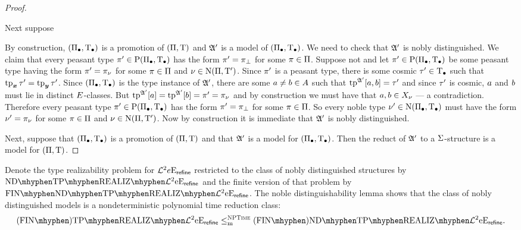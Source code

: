 \begin{proof}
\begin{itemize}
  Next suppose 
\end{itemize}

 By
construction, $(\Pi_{\bullet},\mathrm{T}_{\bullet})$ is a promotion of $(\Pi,\mathrm{T})$ and $\mathfrak{A'}$ is a
model of $(\Pi_{\bullet},\mathrm{T}_{\bullet})$.
We need to check that $\mathfrak{A'}$ is nobly distinguished.
We claim that every peasant type ${\pi'} \in \mathrm{P}(\Pi_{\bullet},\mathrm{T}_{\bullet})$ has the form
${\pi'} = {\pi}_{\bot}$ for some $\pi\in\Pi$.
Suppose not and let ${\pi'}\in \mathrm{P}(\Pi_{\bullet},\mathrm{T}_{\bullet})$ be some peasant type having
the form ${\pi'} = {\pi}_{\nu}$ for some $\pi\in\Pi$ and
$\nu\in\mathrm{\mathrm{N}}(\Pi,{\mathrm{T}'})$. 
Since ${\pi'}$ is a peasant type, there is some cosmic ${\tau'} \in \mathrm{T}_{\bullet}$ such
that $\operatorname{tp}_{\bm{x}}{\tau'} = \operatorname{tp}_{\bm{y}}{\tau'}$. Since $(\Pi_{\bullet},\mathrm{T}_{\bullet})$ is the type instance of
$\mathfrak{A'}$, there are some $a \neq b \in A$ such that $\operatorname{tp}^{\mathfrak{A'}}[a,b] = {\tau'}$ and
since ${\tau'}$ is cosmic, $a$ and $b$ must lie in distinct $E$-classes.
But $\operatorname{tp}^{\mathfrak{A'}}[a] = \operatorname{tp}^{\mathfrak{A'}}[b] = {\pi'} = {\pi}_{\nu}$ and by
construction we must have that $a, b \in X_\nu$ --- a contradiction.
Therefore every peasant type ${\pi'} \in \mathrm{P}(\Pi_{\bullet},\mathrm{T}_{\bullet})$ has the form
${\pi'} = {\pi}_{\bot}$ for some $\pi \in \Pi$. So every noble type ${\nu'}
\in \mathrm{\mathrm{N}}(\Pi_{\bullet},\mathrm{T}_{\bullet})$ must have the form ${\nu'} = {\pi}_{\nu}$ for some
$\pi \in \Pi$ and $\nu \in \mathrm{\mathrm{N}}(\Pi,{\mathrm{T}'})$. Now by construction it is
immediate that $\mathfrak{A'}$ is nobly distinguished.

Next, suppose that $(\Pi_{\bullet},\mathrm{T}_{\bullet})$ is a promotion of $(\Pi,\mathrm{T})$ and
that $\mathfrak{A'}$ is a model for $(\Pi_{\bullet},\mathrm{T}_{\bullet})$. Then the reduct of $\mathfrak{A'}$
to a $\mathrm{\Sigma}$-structure is a model for $(\Pi,\mathrm{T})$.
\end{proof}
Denote the type realizability problem for $\mathcal{L}^{2}{e}\mathrm{E}_{\mathsf{refine}}$ restricted to
the class of nobly distinguished structures by $\NDReal{\vFo2\Eea\sze\agrefine}$ and the finite
version of that problem by $\FinNDReal{\vFo2\Eea\sze\agrefine}$.
The noble distinguishability lemma shows that the class of nobly distinguished
models is a nondeterministic polynomial time reduction class:
\[
  \FinAReal{\vFo2\Eea\sze\agrefine} \red{\cNP} \FinANDReal{\vFo2\Eea\sze\agrefine}.
\]

